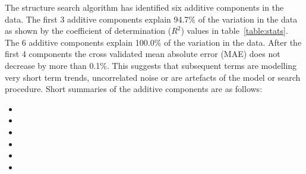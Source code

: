 \documentclass{article} %
\begin{document}
The structure search algorithm has identified six additive components in the data.
The  first 3 additive components explain 94.7\% of the variation in the data as shown by the coefficient of determination ($R^2$) values in table~\ref{table:stats}.
The 6 additive components explain 100.0\% of the variation in the data.
After the first 4 components the cross validated mean absolute error (MAE) does not decrease by more than 0.1\%.
This suggests that subsequent terms are modelling very short term trends, uncorrelated noise or are artefacts of the model or search procedure.
Short summaries of the additive components are as follows:
\begin{itemize}

  \item  

  \item  

  \item  

  \item  

  \item  

  \item  

\end{itemize}
\end{document}
